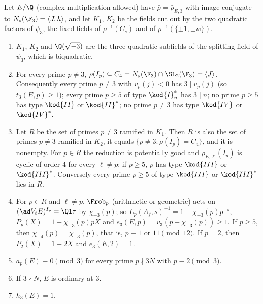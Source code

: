 \begin{proposition}\label{prop:galrep:ns-structure}
Let $E/\Q$ (complex multiplication allowed) have $\bar\rho=\bar\rho_{E,3}$ with image conjugate to $N_s(\F_3)=\langle J,h\rangle$, and let $K_1$, $K_2$ be the fields
cut out by the two quadratic factors of $\psi_3$, the fixed fields of $\bar\rho^{-1}(C_s)$ and of $\bar\rho^{-1}(\{\pm1,\pm w\})$.
\begin{enumerate}[label=(\roman*)]
\item $K_1$, $K_2$ and $\Q(\sqrt{-3})$ are the three quadratic subfields of the splitting field of $\psi_3$, which is biquadratic.
\item For every prime $p\ne3$, $\bar\rho(I_p)\subseteq C_4=N_s(\F_3)\cap\SL_2(\F_3)=\langle J\rangle$. Consequently every prime $p\ne3$ with $v_p(j)<0$ has $3\mid v_p(j)$ (so
$t_3(E,p)\ge1$); every prime $p\ge5$ of type $\kod{I}_n^*$ has $3\mid n$; no prime $p\ge5$ has type $\kod{II}$ or $\kod{II}^*$; no prime $p\ne3$ has type $\kod{IV}$ or $\kod{IV}^*$.
\item Let $R$ be the set of primes $p\ne3$ ramified in $K_1$. Then $R$ is also the set of primes $p\ne3$ ramified in $K_2$, it equals $\{p\ne3:\bar\rho(I_p)=C_4\}$, and
it is nonempty. For $p\in R$ the reduction is potentially good and $\rho_{E,\ell}(I_p)$ is cyclic of order $4$ for every $\ell\ne p$; if $p\ge5$, $p$ has type
$\kod{III}$ or $\kod{III}^*$. Conversely every prime $p\ge5$ of type $\kod{III}$ or $\kod{III}^*$ lies in $R$.
\item For $p\in R$ and $\ell\ne p$, $\Frob_p$ (arithmetic or geometric) acts on $(\ad V_\ell E)^{I_p}=\Ql\tau$ by $\chi_{-3}(p)$; so $L_p(A_f,s)^{-1}=1-\chi_{-3}(p)p^{-s}$,
$P_p(X)=1-\chi_{-3}(p)pX$ and $e_3(E,p)=v_3(p-\chi_{-3}(p))\ge1$. If $p\ge5$, then $\chi_{-4}(p)=\chi_{-3}(p)$, that is, $p\equiv1$ or $11\pmod{12}$. If $p=2$, then $P_2(X)=1+2X$
and $e_3(E,2)=1$.
\item $a_p(E)\equiv0\pmod3$ for every prime $p\nmid3N$ with $p\equiv2\pmod3$.
\item If $3\nmid N$, $E$ is ordinary at $3$.
\item $h_3(E)=1$.
\end{enumerate}
\end{proposition}


